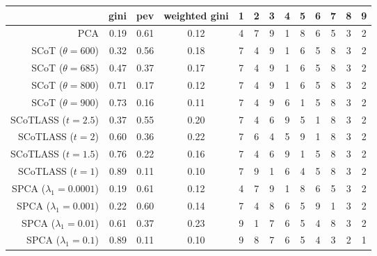 \begin{tabular}{rrrc|ccccccccc}
\toprule
{} &  gini &  pev &  weighted gini &  1 &  2 &  3 &  4 &  5 &  6 &  7 &  8 &  9 \\
\midrule
PCA                         &  0.19 & 0.61 &           0.12 &  4 &  7 &  9 &  1 &  8 &  6 &  5 &  3 &  2 \\
SCoT ($\theta = 600$)       &  0.32 & 0.56 &           0.18 &  7 &  4 &  9 &  1 &  6 &  5 &  8 &  3 &  2 \\
SCoT ($\theta = 685$)       &  0.47 & 0.37 &           0.17 &  7 &  4 &  9 &  1 &  6 &  5 &  8 &  3 &  2 \\
SCoT ($\theta = 800$)       &  0.71 & 0.17 &           0.12 &  7 &  4 &  9 &  1 &  6 &  5 &  8 &  3 &  2 \\
SCoT ($\theta = 900$)       &  0.73 & 0.16 &           0.11 &  7 &  4 &  9 &  6 &  1 &  5 &  8 &  3 &  2 \\
SCoTLASS ($t = 2.5$)        &  0.37 & 0.55 &           0.20 &  7 &  4 &  6 &  9 &  5 &  1 &  8 &  3 &  2 \\
SCoTLASS ($t = 2$)          &  0.60 & 0.36 &           0.22 &  7 &  6 &  4 &  5 &  9 &  1 &  8 &  3 &  2 \\
SCoTLASS ($t = 1.5$)        &  0.76 & 0.22 &           0.16 &  7 &  4 &  6 &  9 &  1 &  5 &  8 &  3 &  2 \\
SCoTLASS ($t = 1$)          &  0.89 & 0.11 &           0.10 &  7 &  9 &  1 &  6 &  4 &  5 &  8 &  3 &  2 \\
SPCA ($\lambda_1 = 0.0001$) &  0.19 & 0.61 &           0.12 &  4 &  7 &  9 &  1 &  8 &  6 &  5 &  3 &  2 \\
SPCA ($\lambda_1 = 0.001$)  &  0.22 & 0.60 &           0.14 &  7 &  4 &  8 &  6 &  5 &  9 &  1 &  3 &  2 \\
SPCA ($\lambda_1 = 0.01$)   &  0.61 & 0.37 &           0.23 &  9 &  1 &  7 &  6 &  5 &  4 &  8 &  3 &  2 \\
SPCA ($\lambda_1 = 0.1$)    &  0.89 & 0.11 &           0.10 &  9 &  8 &  7 &  6 &  5 &  4 &  3 &  2 &  1 \\
\bottomrule
\end{tabular}
